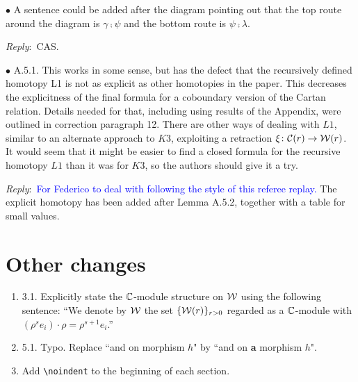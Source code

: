 \documentclass{amsart}
\newcommand{\ar}{\medskip\noindent\textit{Reply}:\ }
\def\subitem{\medskip\noindent$\bullet$ }
\begin{document}
\begin{enumerate}
	\subitem A sentence could be added after the diagram pointing out that the top route
	around the diagram is $\gamma \comp \psi$ and the bottom route is $\psi \comp \lambda$.

	\ar CAS.

	\subitem A.5.1. This works in some sense, but has the defect that the recursively defined homotopy
	L1 is not as explicit as other homotopies in the paper.
	This decreases the explicitness of the final formula for a coboundary version of the Cartan relation.
	Details needed for that, including using results of the Appendix, were outlined in correction paragraph 12.
	There are other ways of dealing with $L1$, similar to an alternate approach to $K3$, exploiting a
	retraction $\xi \colon \mathcal{C}(r) \to \mathcal{W}(r)$.
	It would seem that it might be easier to find a closed formula for the recursive homotopy $L1$ than it was for $K3$, so the authors should give it a try.

	\ar \textcolor{blue}{For Federico to deal with following the style of this referee replay.} The explicit homotopy has been added after Lemma A.5.2, together with a table for small values. 
\end{enumerate}

\section{Other changes}

\begin{enumerate}
	\item 3.1. Explicitly state the $\mathbb{C}$-module structure on $\mathcal{W}$ using the following sentence:
	``We denote by $\mathcal{W}$ the set $\{\mathcal{W}(r)\}_{r > 0}$ regarded as a $\mathbb{C}$-module with $(\rho^s e_i) \cdot \rho = \rho^{s+1} e_i$.''

	\item 5.1. Typo. Replace ``and on morphism $h$" by ``and on \textbf{a} morphism $h$".

	\item Add \verb|\noindent| to the beginning of each section.
\end{enumerate}
\end{document}

